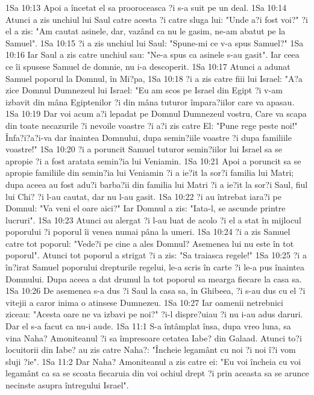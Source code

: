 1Sa 10:13  Apoi a încetat el sa prooroceasca ?i s-a suit pe un deal.
1Sa 10:14  Atunci a zis unchiul lui Saul catre acesta ?i catre sluga lui: "Unde a?i fost voi?" ?i el a zis: "Am cautat asinele, dar, vazând ca nu le gasim, ne-am abatut pe la Samuel".
1Sa 10:15  ?i a zis unchiul lui Saul: "Spune-mi ce v-a spus Samuel?"
1Sa 10:16  Iar Saul a zis catre unchiul sau: "Ne-a spus ca asinele s-au gasit". Iar ceea ce îi spusese Samuel de domnie, nu i-a descoperit.
1Sa 10:17  Atunci a adunat Samuel poporul la Domnul, în Mi?pa,
1Sa 10:18  ?i a zis catre fiii lui Israel: "A?a zice Domnul Dumnezeul lui Israel: "Eu am scos pe Israel din Egipt ?i v-am izbavit din mâna Egiptenilor ?i din mâna tuturor împara?iilor care va apasau.
1Sa 10:19  Dar voi acum a?i lepadat pe Domnul Dumnezeul vostru, Care va scapa din toate necazurile ?i nevoile voastre ?i a?i zis catre El: "Pune rege peste noi!" Înfa?i?a?i-va dar înaintea Domnului, dupa semin?iile voastre ?i dupa familiile voastre!"
1Sa 10:20  ?i a poruncit Samuel tuturor semin?iilor lui Israel sa se apropie ?i a fost aratata semin?ia lui Veniamin.
1Sa 10:21  Apoi a poruncit sa se apropie familiile din semin?ia lui Veniamin ?i a ie?it la sor?i familia lui Matri; dupa aceea au fost adu?i barba?ii din familia lui Matri ?i a ie?it la sor?i Saul, fiul lui Chi? ?i l-au cautat, dar nu l-au gasit.
1Sa 10:22  ?i au întrebat iara?i pe Domnul: "Va veni el oare aici?" Iar Domnul a zis: "Iata-l, se ascunde printre lucruri".
1Sa 10:23  Atunci au alergat ?i l-au luat de acolo ?i el a stat în mijlocul poporului ?i poporul îi venea numai pâna la umeri.
1Sa 10:24  ?i a zis Samuel catre tot poporul: "Vede?i pe cine a ales Domnul? Asemenea lui nu este în tot poporul". Atunci tot poporul a strigat ?i a zis: "Sa traiasca regele!"
1Sa 10:25  ?i a în?irat Samuel poporului drepturile regelui, le-a scris în carte ?i le-a pus înaintea Domnului. Dupa aceea a dat drumul la tot poporul sa mearga fiecare la casa sa.
1Sa 10:26  De asemenea s-a dus ?i Saul la casa sa, în Ghibeea, ?i s-au dus cu el ?i vitejii a caror inima o atinsese Dumnezeu.
1Sa 10:27  Iar oamenii netrebnici ziceau: "Acesta oare ne va izbavi pe noi?" ?i-l dispre?uiau ?i nu i-au adus daruri. Dar el s-a facut ca nu-i aude.
1Sa 11:1  S-a întâmplat însa, dupa vreo luna, sa vina Naha? Amoniteanul ?i sa împresoare cetatea Iabe? din Galaad. Atunci to?i locuitorii din Iabe? au zis catre Naha?: "Încheie legamânt cu noi ?i noi î?i vom sluji ?ie".
1Sa 11:2  Dar Naha? Amoniteanul a zis catre ei: "Eu voi încheia cu voi legamânt ca sa se scoata fiecaruia din voi ochiul drept ?i prin aceasta sa se arunce necinste asupra întregului Israel".
